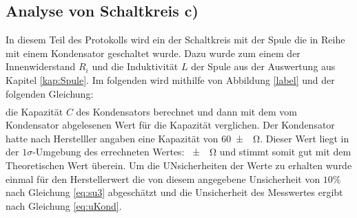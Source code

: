 \subsection{Analyse von Schaltkreis c)}
In diesem Teil des Protokolls wird ein der Schaltkreis mit der Spule die in Reihe mit einem Kondensator geschaltet wurde.
Dazu wurde zum einem der Innenwiderstand $R_i$ und die Induktivität $L$ der Spule aus der Auswertung aus Kapitel \ref{kap:Spule}.
Im folgenden wird mithilfe von Abbildung \ref{label}
und der folgenden Gleichung:
\begin{align}
	
\end{align}
die Kapazität $C$ des Kondensators berechnet und dann mit dem vom Kondensator abgelesenen Wert für die Kapazität verglichen.
Der Kondensator hatte nach Herstelller angaben eine Kapazität von \SI{60+-}{\ohm}.
Dieser Wert liegt in der $1\sigma$-Umgebung des errechneten Wertes: \SI{+-}{\ohm} und stimmt somit gut mit dem Theoretischen Wert überein.
Um die UNsicherheiten der Werte zu erhalten wurde einmal für den Herstellerwert die von diesem angegebene Unsicherheit von $10\%$ nach Gleichung
\ref{eq:su3} abgeschätzt und die Unsicherheit des Messwertes ergibt nach Gleichung \ref{eq:uKond}.
